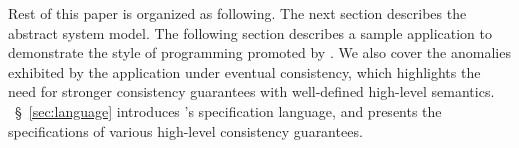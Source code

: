 Rest of this paper is organized as following. The next section
describes the abstract system model. The following section describes a
sample application to demonstrate the style of programming promoted by
\name. We also cover the anomalies exhibited by the application under
eventual consistency, which highlights the need for stronger
consistency guarantees with well-defined high-level semantics.
~\S~\ref{sec:language} introduces \name's specification language, and
presents the specifications of various high-level consistency
guarantees. 
